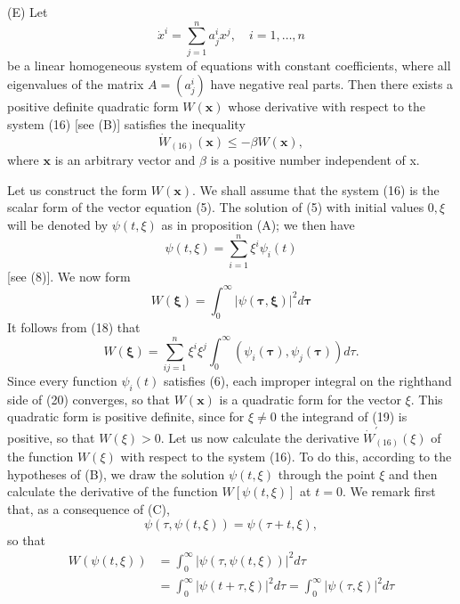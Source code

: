 \documentclass[10pt,a5paper]{book}
\theoremstyle{plain}
\theoremstyle{definition}
\theoremstyle{remark}
\begin{document}
(E) Let
\begin{equation*}
\dot{x}^{i}=\sum_{j=1}^{n} a_{j}^{i} x^{j}, \quad i=1, \ldots, n \tag{16}
\end{equation*}
be a linear homogeneous system of equations with constant coefficients, where all eigenvalues of the matrix $A=\left(a_{j}^{i}\right)$ have negative real parts. Then there exists a positive definite quadratic form $W(\mathbf{x})$ whose derivative with respect to the system (16) [see (B)] satisfies the inequality
\begin{equation*}
\dot{W}_{(16)}(\mathbf{x}) \leq-\beta W(\mathbf{x}), \tag{17}
\end{equation*}
where $\mathbf{x}$ is an arbitrary vector and $\beta$ is a positive number independent of x.

Let us construct the form $W(\mathbf{x})$. We shall assume that the system (16) is the scalar form of the vector equation (5). The solution of (5) with initial values $0, \xi$ will be denoted by $\psi(t, \xi)$ as in proposition (A); we then have
\begin{equation*}
\psi(t, \xi)=\sum_{i=1}^{n} \xi^{i} \psi_{i}(t) \tag{18}
\end{equation*}
[see (8)]. We now form
\begin{equation*}
W(\boldsymbol{\xi})=\int_{0}^{\infty}|\psi(\boldsymbol{\tau}, \boldsymbol{\xi})|^{2} d \boldsymbol{\tau} \tag{19}
\end{equation*}
It follows from (18) that
\begin{equation*}
W(\boldsymbol{\xi})=\sum_{i j=1}^{n} \xi^{i} \xi^{j} \int_{0}^{\infty}\left(\psi_{i}(\boldsymbol{\tau}), \psi_{j}(\boldsymbol{\tau})\right) d \tau . \tag{20}
\end{equation*}
Since every function $\psi_{i}(t)$ satisfies (6), each improper integral on the righthand side of (20) converges, so that $W(\mathbf{x})$ is a quadratic form for the vector $\xi$. This quadratic form is positive definite, since for $\xi \neq 0$ the integrand of (19) is positive, so that $W(\xi)>0$. Let us now calculate the derivative $\dot{W}_{(16)}^{\prime}(\xi)$ of the function $W(\xi)$ with respect to the system (16). To do this, according to the hypotheses of (B), we draw the solution $\psi(t, \xi)$ through the point $\xi$ and then calculate the derivative of the function $W[\psi(t, \xi)]$ at $t=0$. We remark first that, as a consequence of (C),
\[
\psi(\tau, \psi(t, \xi))=\psi(\tau+t, \xi),
\]
so that
\[
\begin{aligned}
W(\psi(t, \xi)) & =\int_{0}^{\infty}|\psi(\tau, \psi(t, \xi))|^{2} d \tau \\
& =\int_{0}^{\infty}|\psi(t+\tau, \xi)|^{2} d \tau=\int_{0}^{\infty}|\psi(\tau, \xi)|^{2} d \tau
\end{aligned}
\]
\end{document}
